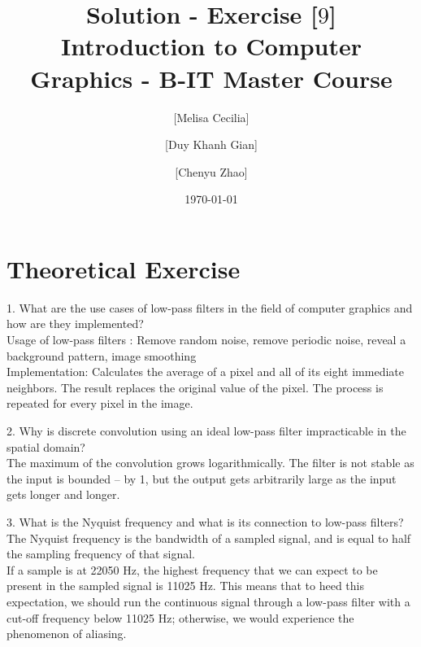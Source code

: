 \documentclass[10pt,a4paper]{article}
\begin{document}
\title{Solution - Exercise [$9$]\\
\small{Introduction to Computer Graphics - B-IT Master Course}}
\author{ [Melisa Cecilia] \and [Duy Khanh Gian] \and [Chenyu Zhao]}
\date{\today}
\maketitle

\section*{Theoretical Exercise}

\begin{flushleft}
1. What are the use cases of low-pass filters in the field of computer graphics and how are they implemented? \\[1\baselineskip]

Usage of low-pass filters : Remove random noise, remove periodic noise, reveal a background pattern, image smoothing \\[1\baselineskip]
Implementation:  Calculates the average of a pixel and all of its eight immediate neighbors. The result replaces the original value of the pixel. The process is repeated for every pixel in the image.
\end{flushleft}

\begin{flushleft}
2. Why is discrete convolution using an ideal low-pass filter impracticable in the spatial domain? \\[1\baselineskip]

The maximum of the convolution grows logarithmically. The filter is not stable as the input is bounded -- by 1, but the output gets arbitrarily large as the input gets longer and longer.

\end{flushleft}

\begin{flushleft}
3. What is the Nyquist frequency and what is its connection to low-pass filters?  \\[1\baselineskip]

The Nyquist frequency is the bandwidth of a sampled signal, and is equal to half the sampling frequency of that signal. \\
If a sample is at 22050 Hz, the highest frequency that we can expect to be present in the sampled signal is 11025 Hz. This means that to heed this expectation, we should run the continuous signal through a low-pass filter with a cut-off frequency below 11025 Hz; otherwise, we would experience the phenomenon of aliasing.

\end{flushleft}
\end{document}
